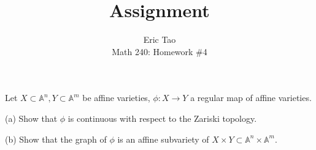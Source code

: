 \documentclass[10pt]{article}
\newenvironment{problem}[2][Problem]{\begin{trivlist}
\item[\hskip \labelsep {\bfseries #1}\hskip \labelsep {\bfseries #2.}]}{\end{trivlist}}
\begin{document}
 
\title{Assignment}
\author{Eric Tao\\
Math 240: Homework \#4}
\maketitle
 
\begin{problem}{4.1}

Let $X \subset \mathbb{A}^n, Y \subset \mathbb{A}^m$ be affine varieties, $\phi: X \to Y$ a regular map of affine varieties.

(a) Show that $\phi$ is continuous with respect to the Zariski topology.

(b) Show that the graph of $\phi$ is an affine subvariety of $X \times Y \subset \mathbb{A}^n \times \mathbb{A}^m$.

\end{problem}
\end{document}
